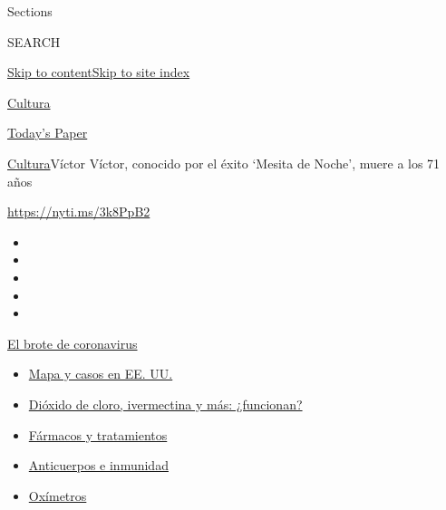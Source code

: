 Sections

SEARCH

\protect\hyperlink{site-content}{Skip to
content}\protect\hyperlink{site-index}{Skip to site index}

\href{https://www.nytimes3xbfgragh.onion/es/section/cultura}{Cultura}

\href{https://myaccount.nytimes3xbfgragh.onion/auth/login?response_type=cookie\&client_id=vi}{}

\href{https://www.nytimes3xbfgragh.onion/section/todayspaper}{Today's
Paper}

\href{/es/section/cultura}{Cultura}\textbar{}Víctor Víctor, conocido por
el éxito `Mesita de Noche', muere a los 71 años

\url{https://nyti.ms/3k8PpB2}

\begin{itemize}
\item
\item
\item
\item
\item
\end{itemize}

\href{https://www.nytimes3xbfgragh.onion/es/spotlight/coronavirus?action=click\&pgtype=Article\&state=default\&region=TOP_BANNER\&context=storylines_menu}{El
brote de coronavirus}

\begin{itemize}
\tightlist
\item
  \href{https://www.nytimes3xbfgragh.onion/es/interactive/2020/espanol/mundo/coronavirus-en-estados-unidos.html?action=click\&pgtype=Article\&state=default\&region=TOP_BANNER\&context=storylines_menu}{Mapa
  y casos en EE. UU.}
\item
  \href{https://www.nytimes3xbfgragh.onion/es/2020/07/23/espanol/america-latina/bolivia-cloro-coronavirus-ivermectina.html?action=click\&pgtype=Article\&state=default\&region=TOP_BANNER\&context=storylines_menu}{Dióxido
  de cloro, ivermectina y más: ¿funcionan?}
\item
  \href{https://www.nytimes3xbfgragh.onion/es/interactive/2020/science/coronavirus-tratamientos-curas.html?action=click\&pgtype=Article\&state=default\&region=TOP_BANNER\&context=storylines_menu}{Fármacos
  y tratamientos}
\item
  \href{https://www.nytimes3xbfgragh.onion/es/2020/07/28/espanol/ciencia-y-tecnologia/anticuerpos-coronavirus-inmunidad.html?action=click\&pgtype=Article\&state=default\&region=TOP_BANNER\&context=storylines_menu}{Anticuerpos
  e inmunidad}
\item
  \href{https://www.nytimes3xbfgragh.onion/es/2020/04/29/espanol/estilos-de-vida/oximetro-para-que-sirve.html?action=click\&pgtype=Article\&state=default\&region=TOP_BANNER\&context=storylines_menu}{Oxímetros}
\end{itemize}

